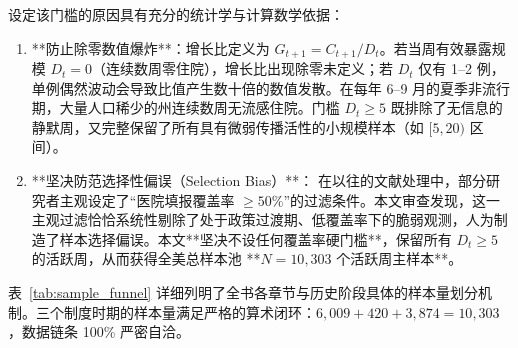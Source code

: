 设定该门槛的原因具有充分的统计学与计算数学依据：
\begin{enumerate}[label=(\arabic*)]
    \item **防止除零数值爆炸**：增长比定义为 $G_{t+1} = C_{t+1} / D_t$。若当周有效暴露规模 $D_t = 0$（连续数周零住院），增长比出现除零未定义；若 $D_t$ 仅有 1--2 例，单例偶然波动会导致比值产生数十倍的数值发散。在每年 6--9 月的夏季非流行期，大量人口稀少的州连续数周无流感住院。门槛 $D_t \ge 5$ 既排除了无信息的静默周，又完整保留了所有具有微弱传播活性的小规模样本（如 $[5, 20)$ 区间）。
    \item **坚决防范选择性偏误（Selection Bias）**：
    在以往的文献处理中，部分研究者主观设定了“医院填报覆盖率 $\ge 50\%$”的过滤条件。本文审查发现，这一主观过滤恰恰系统性剔除了处于政策过渡期、低覆盖率下的脆弱观测，人为制造了样本选择偏误。本文**坚决不设任何覆盖率硬门槛**，保留所有 $D_t \ge 5$ 的活跃周，从而获得全美总样本池 **$N = 10{,}303$ 个活跃周主样本**。
\end{enumerate}

表~\ref{tab:sample_funnel} 详细列明了全书各章节与历史阶段具体的样本量划分机制。三个制度时期的样本量满足严格的算术闭环：$6{,}009 + 420 + 3{,}874 = 10{,}303$，数据链条 100\% 严密自洽。

